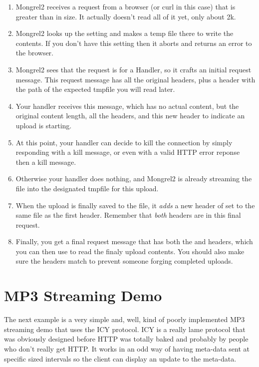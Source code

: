 \begin{enumerate}
\item Mongrel2 receives a request from a browser (or curl in this case) that is greater than  in size.  It actually doesn't read all of it yet, only about 2k.
\item Mongrel2 looks up the  setting and makes a temp file there to write the contents.  If you don't have this setting then it aborts and returns an error to the browser.
\item Mongrel2 sees that the request is for a Handler, so it crafts an initial request message.  This request message has all the original headers, plus a  header with the path of the expected tmpfile you will read later.
\item Your handler receives this message, which has no actual content, but the original content length, all the headers, and this new header to indicate an upload is starting.
\item At this point, your handler can decide to kill the connection by simply responding with a kill message, or even with a valid HTTP error reponse then a kill message.
\item Otherwise your handler does nothing, and Mongrel2 is already streaming the file into the designated tmpfile for this upload.
\item When the upload is finally saved to the file, it \emph{adds} a new header of  set to the same file as the first header.  Remember that \emph{both} headers are in this final request.
\item Finally, you get a final request message that has both the  and  headers, which you can then use to read the finaly upload contents.  You should also make sure the headers match to prevent someone forging completed uploads.
\end{enumerate}


\section{MP3 Streaming Demo}

The next example is a very simple and, well, kind of poorly implemented
MP3 streaming demo that uses the ICY protocol.  ICY is a really lame
protocol that was obviously designed before HTTP was totally baked
and probably by people who don't really get HTTP.  It works in an odd
way of having meta-data sent at specific sized intervals so the
client can display an update to the meta-data.

